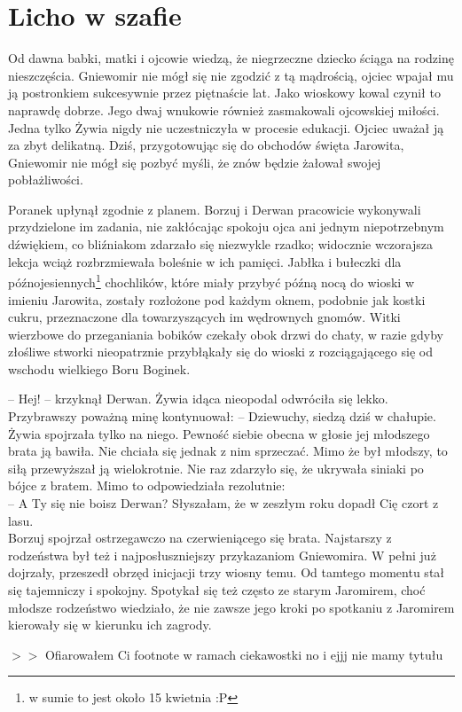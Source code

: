 \documentclass[12pt]{book}
\begin{document}
\chapter{Licho w szafie}
Od dawna babki, matki i ojcowie wiedzą, że niegrzeczne dziecko ściąga na rodzinę nieszczęścia. Gniewomir nie mógł się nie zgodzić z tą mądrością, ojciec wpajał mu ją postronkiem sukcesywnie przez piętnaście lat. Jako wioskowy kowal czynił to naprawdę dobrze. Jego dwaj wnukowie również zasmakowali ojcowskiej miłości. Jedna tylko Żywia nigdy nie uczestniczyła w procesie edukacji. Ojciec uważał ją za zbyt delikatną. Dziś, przygotowując się do obchodów święta Jarowita, Gniewomir nie mógł się pozbyć myśli, że znów będzie żałował swojej pobłażliwości. \par
Poranek upłynął zgodnie z planem. Borzuj i Derwan pracowicie wykonywali przydzielone im zadania, nie zakłócając spokoju ojca ani jednym niepotrzebnym dźwiękiem, co bliźniakom zdarzało się niezwykle rzadko; widocznie wczorajsza lekcja wciąż rozbrzmiewała boleśnie w ich pamięci. Jabłka i bułeczki dla późnojesiennych\footnote{w sumie to jest około 15 kwietnia :P} chochlików, które miały przybyć późną nocą do wioski w imieniu Jarowita, zostały rozłożone pod każdym oknem, podobnie jak kostki cukru, przeznaczone dla towarzyszących im wędrownych gnomów. Witki wierzbowe do przeganiania bobików czekały obok drzwi do chaty, w razie gdyby złośliwe stworki nieopatrznie przybłąkały się do wioski z rozciągającego się od wschodu wielkiego Boru Boginek. \par
-- Hej! -- krzyknął Derwan. Żywia idąca nieopodal odwróciła się lekko. Przybrawszy poważną minę kontynuował: -- Dziewuchy, siedzą dziś w chałupie.\\
Żywia spojrzała tylko na niego. Pewność siebie obecna w głosie jej młodszego brata ją bawiła. Nie chciała się jednak z nim sprzeczać. Mimo że był młodszy, to siłą przewyższał ją wielokrotnie. Nie raz zdarzyło się, że ukrywała siniaki po bójce z bratem. Mimo to odpowiedziała rezolutnie:\\
\indent -- A Ty się nie boisz Derwan? Słyszałam, że w zeszłym roku dopadł Cię czort z lasu. \\ 
Borzuj spojrzał ostrzegawczo na czerwieniącego się brata. Najstarszy z rodzeństwa był też i najposłuszniejszy przykazaniom Gniewomira. W pełni już dojrzały, przeszedł obrzęd inicjacji trzy wiosny temu. Od tamtego momentu stał się tajemniczy i spokojny. Spotykał się też często ze starym   Jaromirem, choć młodsze rodzeństwo wiedziało, że nie zawsze jego kroki po spotkaniu z Jaromirem kierowały się w kierunku ich zagrody.\\ \par
$>>$
Ofiarowałem Ci footnote w ramach ciekawostki no i ejjj nie mamy tytułu
\end{document}
